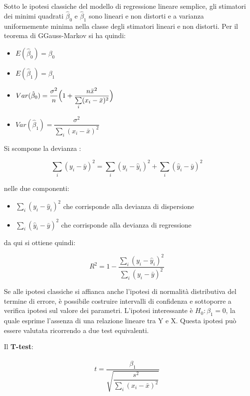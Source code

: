 \documentclass[a4paper]{extarticle}
\begin{document}
Sotto le ipotesi classiche del modello di regressione lineare semplice, gli stimatori dei minimi quadrati $\hat \beta_0$ e $\hat \beta_1$ sono lineari e non distorti e a varianza uniformemente minima nella classe degli stimatori lineari e non distorti. Per il teorema di GGauss-Markov si ha quindi:
\begin{itemize}
\item $E(\hat \beta_0) = \beta_0$
\item $E(\hat \beta_1) = \beta_1$ 
\item $Var(\hat \beta_0) =  \dfrac{\sigma^2}{n}\Bigl(1+\dfrac{n \bar x^2}{\sum\limits_i(x_i-\bar x)^2}\Bigr)$ 
\item $Var(\hat \beta_1) = \dfrac{\sigma^2}{\sum\limits_i (x_i- \bar x)^2}$ 
\end{itemize}

Si scompone la devianza :

\begin{equation*}
\sum\limits_i (y_i - \bar y)^2 = \sum\limits_i(y_i - \hat y_i)^2 + \sum\limits_i(\hat y_i - \bar y)^2
\end{equation*}

 nelle due componenti:
 
 \begin{itemize}
 \item $\sum\limits_i(y_i - \hat y_i)^2$ che corrisponde alla devianza di dispersione
 \item $ \sum\limits_i(\hat y_i - \bar y)^2$ che corrisponde alla devianza di regressione
 \end{itemize}
 
 da qui si ottiene quindi:
 
 \begin{equation*}
R^2 = 1 - \dfrac{\sum\limits_i(y_i - \hat y_i)^2}{\sum\limits_i (y_i - \bar y)^2} 
\end{equation*}

Se alle ipotesi classiche si affianca anche l'ipotesi di normalità distributiva del termine di errore, è possibile costruire intervalli di confidenza e sottoporre a verifica ipotesi sul valore dei parametri. L'ipotesi interessante è $H_0: \beta_1 = 0$, la quale esprime l'assenza di una relazione lineare tra Y e X. Questa ipotesi può essere valutata ricorrendo a due test equivalenti.

Il \textbf{T-test}:

\begin{equation*}
t = \dfrac{\hat \beta_1}{\sqrt{\dfrac{s^2}{\sum\limits_i(x_i - \bar x)^2}}}
\end{equation*}
\end{document}
